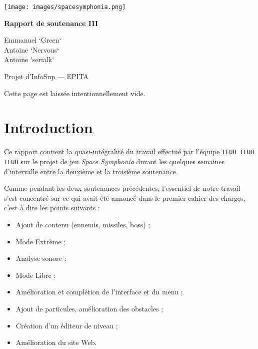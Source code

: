 \documentclass[12pt,a4paper]{article}
\title{}
\author{}
\date{}
\newcommand{\subtitle}{Rapport de soutenance III}
\begin{document}
	\begin{titlepage}
	\begin{center}
	\vspace{8cm}
	\texttt{[image: images/spacesymphonia.png]}

	\vspace{0.5cm}
	\LARGE{\textbf{\subtitle}}

	\vspace{1cm}
	\large{\textsf{
	Emmanuel `Green`  \\
	Antoine `Nervous`  \\
	Antoine `serialk` }}

	\vspace{2cm}

	\large{\textsf{Projet d'InfoSup --- EPITA}}

	\end{center}
	\end{titlepage}
	\newpage
	Cette page est laissée intentionnellement vide.	
	\newpage
	\setcounter{tocdepth}{3}
	\tableofcontents
	\newpage
	\pagestyle{headings}
	
	\section{Introduction}
		\par
		Ce rapport contient la quasi-intégralité du travail effectué par l'équipe \texttt{TEUH TEUH TEUH} sur le projet de jeu \emph{Space Symphonia} durant les quelques semaines d'intervalle entre la deuxième et la troisième soutenance. \\
		\par
		Comme pendant les deux soutenances précédentes, l'essentiel de notre travail s'est concentré sur ce qui avait été annoncé dans le premier cahier des charges, c'est à dire les points suivants : \\
		\par
		\begin{itemize}
		\item Ajout de contenu (ennemis, missiles, boss) ;
		\item Mode Extrême ;
		\item Analyse sonore ;
		\item Mode Libre ;
		\item Amélioration et complétion de l'interface et du menu ;
		\item Ajout de particules, amélioration des obstacles ;
		\item Création d'un éditeur de niveau ;
		\item Amélioration du site Web.
		\end{itemize}
		\newpage
		
\end{document}
